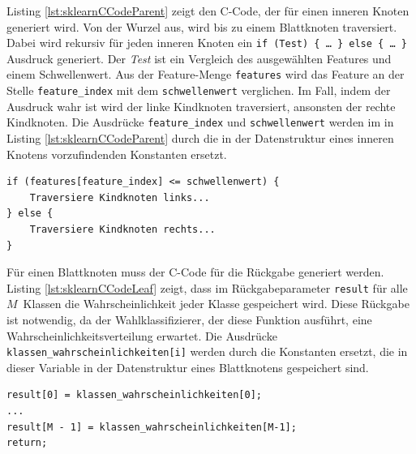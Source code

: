 Listing \ref{lst:sklearnCCodeParent} zeigt den C-Code, der für einen inneren Knoten generiert wird. Von der Wurzel aus, wird bis zu einem Blattknoten traversiert. Dabei wird rekursiv für jeden inneren
Knoten ein \texttt{if (Test) \{ \ldots\ \} else \{ \ldots\ \}} Ausdruck generiert. Der \textit{Test} ist ein Vergleich des ausgewählten Features und einem Schwellenwert. Aus der Feature-Menge \texttt{features}
wird das Feature an der Stelle \texttt{feature\_index} mit dem \texttt{schwellenwert} verglichen. Im Fall, indem der Ausdruck wahr ist wird der linke Kindknoten traversiert, ansonsten der rechte Kindknoten.
Die Ausdrücke \texttt{feature\_index} und \texttt{schwellenwert} werden im in Listing \ref{lst:sklearnCCodeParent} durch die in der Datenstruktur eines inneren Knotens vorzufindenden Konstanten ersetzt.
\begin{lstlisting}[label=lst:sklearnCCodeParent,caption={C-Code eines inneren Knotens.}]
if (features[feature_index] <= schwellenwert) {
    Traversiere Kindknoten links...
} else {
    Traversiere Kindknoten rechts...
}
\end{lstlisting}
Für einen Blattknoten muss der C-Code für die Rückgabe generiert werden. Listing \ref{lst:sklearnCCodeLeaf} zeigt, dass im Rückgabeparameter \texttt{result} für alle $M$~Klassen die Wahrscheinlichkeit
jeder Klasse gespeichert wird. Diese Rückgabe ist notwendig, da der Wahlklassifizierer, der diese Funktion ausführt, eine Wahrscheinlichkeitsverteilung erwartet.
Die Ausdrücke \texttt{klassen\_wahrscheinlichkeiten[i]} werden durch die Konstanten ersetzt, die in dieser Variable in der Datenstruktur eines Blattknotens gespeichert sind.
\begin{lstlisting}[label=lst:sklearnCCodeLeaf,caption={C-Code eines Blattknotens.}]
result[0] = klassen_wahrscheinlichkeiten[0];
...
result[M - 1] = klassen_wahrscheinlichkeiten[M-1];
return;
\end{lstlisting}

